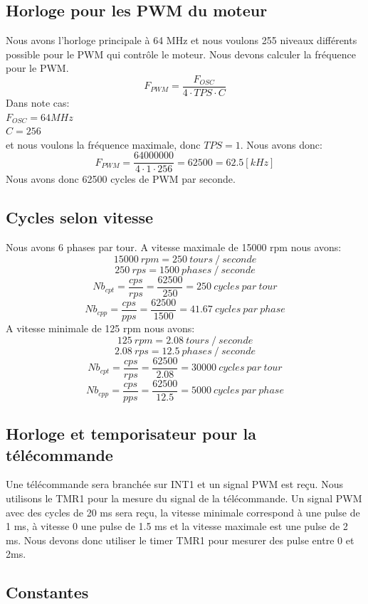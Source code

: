 \documentclass[fleqn, 11pt, a4paper]{article}
\begin{document}
  \subsection{Horloge pour les PWM du moteur}
  Nous avons l'horloge principale à 64 MHz et nous voulons 255 niveaux différents possible pour le PWM qui contrôle le moteur.
  Nous devons calculer la fréquence pour le PWM.
  $$F_{PWM} = \frac{F_{OSC}}{4 \cdot TPS \cdot C}$$
  Dans note cas:\\
  $F_{OSC} = 64 MHz$\\
  $C = 256$\\
  et nous voulons la fréquence maximale, donc $TPS = 1$.
  Nous avons donc:
  $$F_{PWM} = \frac{64000000}{4 \cdot 1 \cdot 256} = 62500 = 62.5 [kHz]$$
  Nous avons donc 62500 cycles de PWM par seconde.
  
  \subsection{Cycles selon vitesse}
  Nous avons 6 phases par tour.
  A vitesse maximale de 15000 rpm nous avons:
  $$15000 \ rpm = 250\ tours\ /\ seconde$$
  $$ 250 \ rps = 1500\ phases\ /\ seconde$$
  $$Nb_{cpt} = \frac{cps}{rps} = \frac{62500}{250} = 250\ cycles\ par\ tour$$
  $$Nb_{cpp} = \frac{cps}{pps} = \frac{62500}{1500} = 41.67\ cycles\ par\ phase$$
  A vitesse minimale de 125 rpm nous avons:
  $$125 \ rpm = 2.08\ tours\ /\ seconde$$
  $$ 2.08 \ rps = 12.5\ phases\ /\ seconde$$
  $$Nb_{cpt} = \frac{cps}{rps} = \frac{62500}{2.08} = 30000\ cycles\ par\ tour$$
  $$Nb_{cpp} = \frac{cps}{pps} = \frac{62500}{12.5} = 5000\ cycles\ par\ phase$$
  
  \subsection{Horloge et temporisateur pour la télécommande}
  Une télécommande sera branchée sur INT1 et un signal PWM est reçu.
  Nous utilisons le TMR1 pour la mesure du signal de la télécommande.
  Un signal PWM avec des cycles de 20 ms sera reçu, la vitesse minimale correspond à une pulse de 1 ms, à vitesse 0 une pulse de 1.5 ms et la vitesse maximale est une pulse de 2 ms.
  Nous devons donc utiliser le timer TMR1 pour mesurer des pulse entre 0 et 2ms.

	\newpage
	\begin{appendix}
	\section{Constantes}

	
	\end{appendix}
	
	
\end{document}
